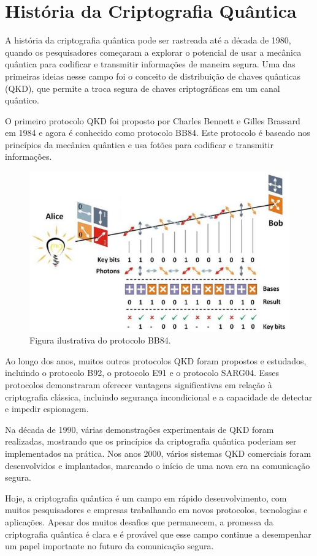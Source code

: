 \chapter{História da Criptografia Quântica}

A história da criptografia quântica pode ser rastreada até a década de 1980, quando os pesquisadores começaram a explorar o potencial de usar a mecânica quântica para codificar e transmitir informações de maneira segura. Uma das primeiras ideias nesse campo foi o conceito de distribuição de chaves quânticas (QKD), que permite a troca segura de chaves criptográficas em um canal quântico.

O primeiro protocolo QKD foi proposto por Charles Bennett e Gilles Brassard em 1984 e agora é conhecido como protocolo BB84. Este protocolo é baseado nos princípios da mecânica quântica e usa fotões para codificar e transmitir informações.

\begin{figure}[!hbt]
  \centering
  \includegraphics[width=\textwidth]{images/cool-bb84.jpg}
  \caption{Figura ilustrativa do protocolo BB84.}
  \label{fig:cool-bb84}
\end{figure}
\FloatBarrier

Ao longo dos anos, muitos outros protocolos QKD foram propostos e estudados, incluindo o protocolo B92, o protocolo E91 e o protocolo SARG04. Esses protocolos demonstraram oferecer vantagens significativas em relação à criptografia clássica, incluindo segurança incondicional e a capacidade de detectar e impedir espionagem.

Na década de 1990, várias demonstrações experimentais de QKD foram realizadas, mostrando que os princípios da criptografia quântica poderiam ser implementados na prática. Nos anos 2000, vários sistemas QKD comerciais foram desenvolvidos e implantados, marcando o início de uma nova era na comunicação segura.

Hoje, a criptografia quântica é um campo em rápido desenvolvimento, com muitos pesquisadores e empresas trabalhando em novos protocolos, tecnologias e aplicações. Apesar dos muitos desafios que permanecem, a promessa da criptografia quântica é clara e é provável que esse campo continue a desempenhar um papel importante no futuro da comunicação segura.

\newpage
